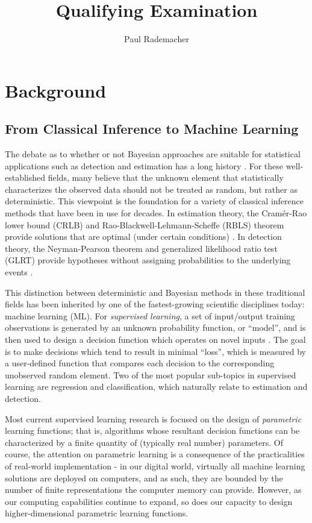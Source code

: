 \documentclass[12pt]{report}
\title{Qualifying Examination}
\author{Paul Rademacher}
\begin{document}
\maketitle

\newpage
\tableofcontents


\chapter{Background} \label{sec:background}

\section{From Classical Inference to Machine Learning}

The debate as to whether or not Bayesian approaches are suitable for statistical applications such as detection and estimation has a long history \cite{box}. For these well-established fields, many believe that the unknown element that statistically characterizes the observed data should not be treated as random, but rather as deterministic. This viewpoint is the foundation for a variety of classical inference methods that have been in use for decades. In estimation theory, the Cram\'er-Rao lower bound (CRLB) and Rao-Blackwell-Lehmann-Scheffe (RBLS) theorem provide solutions that are optimal (under certain conditions) \cite{kay-est}. In detection theory, the Neyman-Pearson theorem and generalized likelihood ratio test (GLRT) provide hypotheses without assigning probabilities to the underlying events \cite{kay-det}.

This distinction between deterministic and Bayesian methods in these traditional fields has been inherited by one of the fastest-growing scientific disciplines today: machine learning (ML). For \emph{supervised learning}, a set of input/output training observations is generated by an unknown probability function, or ``model'', and is then used to design a decision function which operates on novel inputs \cite{bishop}. The goal is to make decisions which tend to result in minimal ``loss'', which is measured by a user-defined function that compares each decision to the corresponding unobserved random element. Two of the most popular sub-topics in supervised learning are regression and classification, which naturally relate to estimation and detection. 

Most current supervised learning research is focused on the design of \emph{parametric} learning functions; that is, algorithms whose resultant decision functions can be characterized by a finite quantity of (typically real number) parameters. Of course, the attention on parametric learning is a consequence of the practicalities of real-world implementation - in our digital world, virtually all machine learning solutions are deployed on computers, and as such, they are bounded by the number of finite representations the computer memory can provide. However, as our computing capabilities continue to expand, so does our capacity to design higher-dimensional parametric learning functions.
\end{document}
